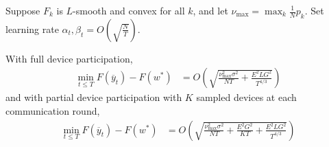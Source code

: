 

\begin{theorem}
	Suppose $F_{k}$ is $L$-smooth and convex for all $k$, and let $\nu_{\max}=\max_{k}\frac{1}{N}p_{k}$.
	Set learning rate $\alpha_{t},\beta_{t}=O(\sqrt{\frac{N}{T}})$.
	
	With full device participation, 
	\begin{align*}
	\min_{t\leq T}F(\overline{y}_{t})-F(w^{\ast}) & =O(\sqrt{\frac{\nu_{\max}^{2}\sigma^{2}}{NT}+\frac{E^{2}LG^{2}}{T^{4/3}}})
	\end{align*}
	and with partial device participation with $K$ sampled devices at
	each communication round, 
	\begin{align*}
	\min_{t\leq T}F(\overline{y}_{t})-F(w^{\ast}) & =O(\sqrt{\frac{\nu_{\max}^{2}\sigma^{2}}{NT}+\frac{E^{2}G^{2}}{KT}+\frac{E^{2}LG^{2}}{T^{4/3}}})
	\end{align*}
\end{theorem}

